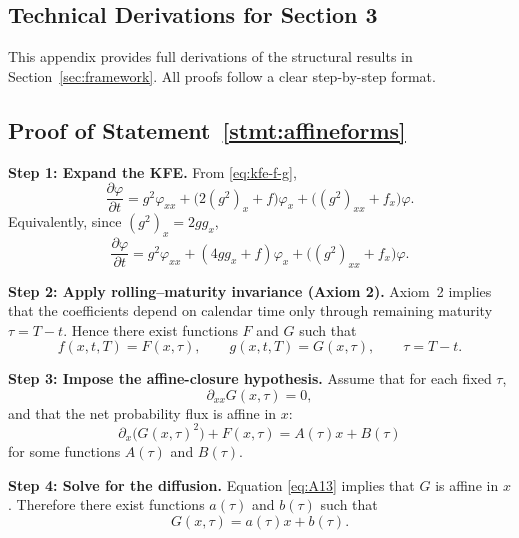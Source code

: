\documentclass[12pt]{article}
\theoremstyle{statementstyle}
\begin{document}
\begin{appendices}
\section{Technical Derivations for Section 3}
\label{appendix:A}

This appendix provides full derivations of the structural results in
Section~\ref{sec:framework}. All proofs follow a clear step-by-step
format.

\subsection{Proof of Statement~\ref{stmt:affineforms}}
\label{appendix:A1}
\medskip
\noindent\textbf{Step 1: Expand the KFE.}  
From \eqref{eq:kfe-f-g},
\begin{equation}
\frac{\partial\varphi}{\partial t}
=
g^{2}\varphi_{xx}
+
\bigl(2(g^{2})_{x}+f\bigr)\varphi_{x}
+
\bigl((g^{2})_{xx}+f_{x}\bigr)\varphi.
\tag{A.1.1}
\end{equation}
Equivalently, since \((g^{2})_{x}=2g g_{x}\),
\[
\frac{\partial\varphi}{\partial t}
=
g^{2}\varphi_{xx}
+
(4g g_{x}+f)\varphi_{x}
+
\bigl((g^{2})_{xx}+f_{x}\bigr)\varphi.
\]

\medskip
\noindent\textbf{Step 2: Apply rolling--maturity invariance (Axiom 2).}  
Axiom~2 implies that the coefficients depend on calendar time only through
remaining maturity \(\tau=T-t\). Hence there exist functions \(F\) and
\(G\) such that
\begin{equation}
f(x,t,T)=F(x,\tau),
\qquad
g(x,t,T)=G(x,\tau),
\qquad \tau=T-t.
\tag{A.1.2}
\end{equation}

\medskip
\noindent\textbf{Step 3: Impose the affine-closure hypothesis.}  
Assume that for each fixed \(\tau\),
\begin{equation}
\partial_{xx}G(x,\tau)=0,
\tag{A.1.3}\label{eq:A13}
\end{equation}
and that the net probability flux is affine in \(x\):
\begin{equation}
\partial_x\!\bigl(G(x,\tau)^2\bigr)+F(x,\tau)=A(\tau)x+B(\tau)
\tag{A.1.4}\label{eq:A14}
\end{equation}
for some functions \(A(\tau)\) and \(B(\tau)\).

\medskip
\noindent\textbf{Step 4: Solve for the diffusion.}  
Equation \eqref{eq:A13} implies that \(G\) is affine in \(x\). Therefore
there exist functions \(a(\tau)\) and \(b(\tau)\) such that
\begin{equation}
G(x,\tau)=a(\tau)x+b(\tau).
\tag{A.1.5}\label{eq:A15}
\end{equation}


\end{appendices}
\end{document}
